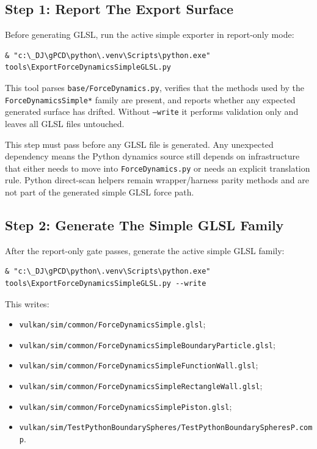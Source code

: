 \subsection{Step 1: Report The Export Surface}

Before generating GLSL, run the active simple exporter in report-only mode:
\begin{verbatim}
& "c:\_DJ\gPCD\python\.venv\Scripts\python.exe" tools\ExportForceDynamicsSimpleGLSL.py
\end{verbatim}

This tool parses \texttt{base/ForceDynamics.py}, verifies that the methods
used by the \texttt{ForceDynamicsSimple*} family are present, and reports
whether any expected generated surface has drifted.  Without \texttt{--write}
it performs validation only and leaves all GLSL files untouched.

This step must pass before any GLSL file is generated.  Any unexpected
dependency means the Python dynamics source still depends on infrastructure
that either needs to move into \texttt{ForceDynamics.py} or needs an explicit
translation rule.  Python direct-scan helpers remain wrapper/harness parity
methods and are not part of the generated simple GLSL force path.

\subsection{Step 2: Generate The Simple GLSL Family}

After the report-only gate passes, generate the active simple GLSL family:
\begin{verbatim}
& "c:\_DJ\gPCD\python\.venv\Scripts\python.exe" tools\ExportForceDynamicsSimpleGLSL.py --write
\end{verbatim}

This writes:
\begin{itemize}
    \item \texttt{vulkan/sim/common/ForceDynamicsSimple.glsl};
    \item \texttt{vulkan/sim/common/ForceDynamicsSimpleBoundaryParticle.glsl};
    \item \texttt{vulkan/sim/common/ForceDynamicsSimpleFunctionWall.glsl};
    \item \texttt{vulkan/sim/common/ForceDynamicsSimpleRectangleWall.glsl};
    \item \texttt{vulkan/sim/common/ForceDynamicsSimplePiston.glsl};
    \item \texttt{vulkan/sim/TestPythonBoundarySpheres/TestPythonBoundarySpheresP.comp}.
\end{itemize}

